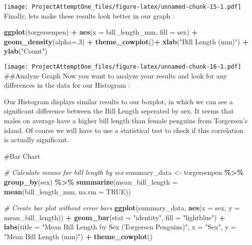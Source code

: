 \documentclass[
]{article}
\newenvironment{Shaded}{\begin{snugshade}}{\end{snugshade}}
\newcommand{\AttributeTok}[1]{\textcolor[rgb]{0.13,0.29,0.53}{#1}}
\newcommand{\CommentTok}[1]{\textcolor[rgb]{0.56,0.35,0.01}{\textit{#1}}}
\newcommand{\ConstantTok}[1]{\textcolor[rgb]{0.56,0.35,0.01}{#1}}
\newcommand{\DecValTok}[1]{\textcolor[rgb]{0.00,0.00,0.81}{#1}}
\newcommand{\FunctionTok}[1]{\textcolor[rgb]{0.13,0.29,0.53}{\textbf{#1}}}
\newcommand{\NormalTok}[1]{#1}
\newcommand{\OtherTok}[1]{\textcolor[rgb]{0.56,0.35,0.01}{#1}}
\newcommand{\SpecialCharTok}[1]{\textcolor[rgb]{0.81,0.36,0.00}{\textbf{#1}}}
\newcommand{\StringTok}[1]{\textcolor[rgb]{0.31,0.60,0.02}{#1}}
\begin{document}
\texttt{[image: ProjectAttemptOne\_files/figure-latex/unnamed-chunk-15-1.pdf]}
Finally, lets make these results look better in our graph :

\begin{Shaded}
\begin{Highlighting}[]
\FunctionTok{ggplot}\NormalTok{(torgersenpen) }\SpecialCharTok{+}
  \FunctionTok{aes}\NormalTok{(}\AttributeTok{x =}\NormalTok{ bill\_length\_mm,  }\AttributeTok{fill =}\NormalTok{ sex) }\SpecialCharTok{+} 
  \FunctionTok{geom\_density}\NormalTok{(}\AttributeTok{alpha=}\NormalTok{.}\DecValTok{3}\NormalTok{) }\SpecialCharTok{+}
  \FunctionTok{theme\_cowplot}\NormalTok{()}\SpecialCharTok{+}
  \FunctionTok{xlab}\NormalTok{(}\StringTok{"Bill Length (mm)"}\NormalTok{) }\SpecialCharTok{+} 
  \FunctionTok{ylab}\NormalTok{(}\StringTok{"Count"}\NormalTok{)}
\end{Highlighting}
\end{Shaded}

\texttt{[image: ProjectAttemptOne\_files/figure-latex/unnamed-chunk-16-1.pdf]}
\#\#Analyze Graph Now you want to analyze your results and look for any
differences in the data for our Histogram :

Our Histogram displays similar results to our boxplot, in which we can
see a significant difference between the Bill Length seperated by sex.
It seems that males on average have a higher bill length than female
penguins from Torgersen's island. Of course we will have to use a
statistical test to check if this correlation is actually significant.

\#Bar Chart

\begin{Shaded}
\begin{Highlighting}[]
\CommentTok{\# Calculate means for bill length by sex}
\NormalTok{summary\_data }\OtherTok{\textless{}{-}}\NormalTok{ torgersenpen }\SpecialCharTok{\%\textgreater{}\%}
  \FunctionTok{group\_by}\NormalTok{(sex) }\SpecialCharTok{\%\textgreater{}\%}
  \FunctionTok{summarize}\NormalTok{(}\AttributeTok{mean\_bill\_length =} \FunctionTok{mean}\NormalTok{(bill\_length\_mm, }\AttributeTok{na.rm =} \ConstantTok{TRUE}\NormalTok{))}

\CommentTok{\# Create bar plot without error bars}
\FunctionTok{ggplot}\NormalTok{(summary\_data, }\FunctionTok{aes}\NormalTok{(}\AttributeTok{x =}\NormalTok{ sex, }\AttributeTok{y =}\NormalTok{ mean\_bill\_length)) }\SpecialCharTok{+}
  \FunctionTok{geom\_bar}\NormalTok{(}\AttributeTok{stat =} \StringTok{"identity"}\NormalTok{, }\AttributeTok{fill =} \StringTok{"lightblue"}\NormalTok{) }\SpecialCharTok{+}
  \FunctionTok{labs}\NormalTok{(}\AttributeTok{title =} \StringTok{"Mean Bill Length by Sex (Torgersen Penguins)"}\NormalTok{,}
       \AttributeTok{x =} \StringTok{"Sex"}\NormalTok{,}
       \AttributeTok{y =} \StringTok{"Mean Bill Length (mm)"}\NormalTok{) }\SpecialCharTok{+}
  \FunctionTok{theme\_cowplot}\NormalTok{()}
\end{Highlighting}
\end{Shaded}
\end{document}
